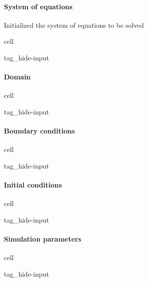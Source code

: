 \documentclass[letterpaper,10pt,english]{jupyterBook}
\begin{document}
\paragraph{System of equations}
\label{\detokenize{ch/pde/euler-quasi-1d:system-of-equations}}
\sphinxAtStartPar
Initialized the system of equations to be solved

\begin{sphinxuseclass}{cell}
\begin{sphinxuseclass}{tag_hide-input}
\end{sphinxuseclass}
\end{sphinxuseclass}

\paragraph{Domain}
\label{\detokenize{ch/pde/euler-quasi-1d:domain}}
\begin{sphinxuseclass}{cell}
\begin{sphinxuseclass}{tag_hide-input}
\end{sphinxuseclass}
\end{sphinxuseclass}

\paragraph{Boundary conditions}
\label{\detokenize{ch/pde/euler-quasi-1d:boundary-conditions}}
\begin{sphinxuseclass}{cell}
\begin{sphinxuseclass}{tag_hide-input}
\end{sphinxuseclass}
\end{sphinxuseclass}

\paragraph{Initial conditions}
\label{\detokenize{ch/pde/euler-quasi-1d:initial-conditions}}
\begin{sphinxuseclass}{cell}
\begin{sphinxuseclass}{tag_hide-input}
\end{sphinxuseclass}
\end{sphinxuseclass}

\paragraph{Simulation parameters}
\label{\detokenize{ch/pde/euler-quasi-1d:simulation-parameters}}
\begin{sphinxuseclass}{cell}
\begin{sphinxuseclass}{tag_hide-input}
\end{sphinxuseclass}
\end{sphinxuseclass}
\end{document}
